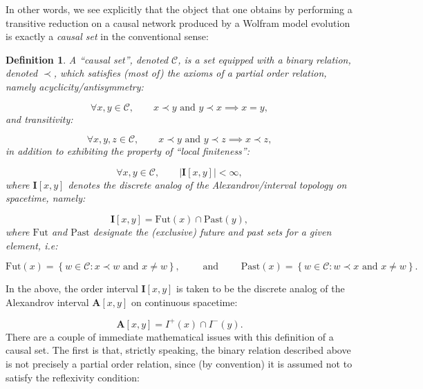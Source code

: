 \documentclass{article}
\newtheorem{definition}{Definition}
\begin{document}
In other words, we see explicitly that the object that one obtains by performing a transitive reduction on a causal network produced by a Wolfram model evolution is exactly a \textit{causal set} in the conventional sense:

\begin{definition}
A ``causal set'', denoted ${\mathcal{C}}$, is a set equipped with a binary relation, denoted ${\prec}$, which satisfies (most of) the axioms of a partial order relation, namely acyclicity/antisymmetry:

\begin{equation}
\forall x, y \in \mathcal{C}, \qquad x \prec y \text{ and } y \prec x \implies x = y,
\end{equation}
and transitivity:

\begin{equation}
\forall x, y, z \in \mathcal{C}, \qquad x \prec y \text{ and } y \prec z \implies x \prec z,
\end{equation}
in addition to exhibiting the property of ``local finiteness'':

\begin{equation}
\forall x, y \in \mathcal{C}, \qquad \left\lvert \mathbf{I} \left[ x, y \right] \right\rvert < \infty,
\end{equation}
where ${\mathbf{I} \left[ x, y \right]}$ denotes the discrete analog of the Alexandrov/interval topology on spacetime, namely:

\begin{equation}
\mathbf{I} \left[ x, y \right] = \mathrm{Fut} \left( x \right) \cap \mathrm{Past} \left( y \right),
\end{equation}
where ${\mathrm{Fut}}$ and ${\mathrm{Past}}$ designate the (exclusive) future and past sets for a given element, i.e:

\begin{equation}
\mathrm{Fut} \left( x \right) = \left\lbrace w \in \mathcal{C} : x \prec w \text{ and } x \neq w \right\rbrace, \qquad \text{ and } \qquad \mathrm{Past} \left( x \right) = \left\lbrace w \in \mathcal{C} : w \prec x \text{ and } x \neq w \right\rbrace.
\end{equation}
\end{definition}
In the above, the order interval ${\mathbf{I} \left[ x, y \right]}$ is taken to be the discrete analog of the Alexandrov interval ${\mathbf{A} \left[ x, y \right]}$ on continuous spacetime:

\begin{equation}
\mathbf{A} \left[ x, y \right] = I^{+} \left( x \right) \cap I^{-} \left( y \right).
\end{equation}
There are a couple of immediate mathematical issues with this definition of a causal set. The first is that, strictly speaking, the binary relation described above is not precisely a partial order relation, since (by convention) it is assumed not to satisfy the reflexivity condition:
\end{document}
